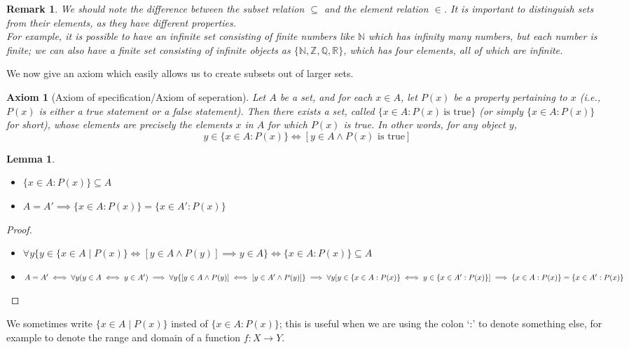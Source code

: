 \documentclass[a4paper]{book}
\newtheorem*{proof}{\textit{Proof.}}
\theoremstyle{break}
\newtheorem{axiom}{Axiom}[chapter]
\newtheorem{lemma}{Lemma}[section]
\newtheorem{remark}{Remark}[section]
\begin{document}
			\begin{remark}
				We should note the difference between the subset relation $\subseteq$ and the element relation $\in$. It is important to distinguish sets from their elements, as they have different properties.\\
				For example, it is possible to have an infinite set consisting of finite numbers like $\mathbb{N}$ which has infinity many numbers, but each number is finite; we can also have a finite set consisting of infinite objects as $\{\mathbb{N},\mathbb{Z},\mathbb{Q},\mathbb{R}\}$, which has four elements, all of which are infinite.
			\end{remark}
			We now give an axiom which easily allows us to create subsets out of larger sets.
			\begin{axiom}[Axiom of specification/Axiom of seperation]
				Let $A$ be a set, and for each $x\in A$, let $P(x)$ be a property pertaining to $x$ (\textit{i.e.,} $P(x)$ is either a true statement or a false statement). Then there exists a set, called $\{x\in A:P(x)~\textrm{is~true}\}$ (or simply $\{x\in A:P(x)\}$ for short), whose elements are precisely the elements $x$ in $A$ for which $P(x)$ is true. In other words, for any object $y$, $$y\in\{x\in A:P(x)\}\iff[y\in A\land P(x)\textrm{~is~true}]$$
			\end{axiom}
			\begin{lemma}~
				\begin{itemize}
					\item $\{x\in A:P(x)\}\subseteq A$
					\item $A=A'\implies\{x\in A:P(x)\}=\{x\in A':P(x)\}$
				\end{itemize}
			\end{lemma}
			\begin{proof}~
				\begin{itemize}
					\item $\forall y\{y\in\{x\in A\mid P(x)\}\iff[y\in A\land P(y)]\implies y\in A\}\iff \{x\in A:P(x)\}\subseteq A$
					\item $A=A'\iff\forall y(y\in A\iff y\in A')\implies\forall y\{[y\in A\land P(y)]\iff[y\in A'\land P(y)]\}\\\implies\forall y[y\in\{x\in A:P(x)\}\iff y\in\{x\in A':P(x)\}]\\\implies\{x\in A:P(x)\}=\{x\in A':P(x)\}$
				\end{itemize}
			\end{proof}
			We sometimes write $\{x\in A\mid P(x)\}$ insted of $\{x\in A:P(x)\}$; this is useful when we are using the colon `:' to denote something else, for example to denote the range and domain of a function $f: X\to Y$.\\
\end{document}
